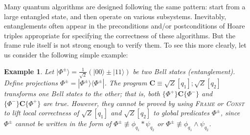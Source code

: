 \documentclass[conference,compsoc, 10pt]{IEEEtran}
\newcommand{\jh}[1]{\textit{\color{red}[JH] : #1}}
\newtheorem{example}{Example}[section]
\newcommand {\prog } {{\mathbf{C}}}
\def\>{\ensuremath{\rangle}}
\def\<{\ensuremath{\langle}}
\begin{document}
	Many quantum algorithms are designed following the same pattern: start from a
  large entangled state, and then operate on various subsystems. Inevitably,
  entanglements often appear in the preconditions and/or postconditions of Hoare
  triples appropriate for specifying the correctness of these algorithms.
  But the frame rule itself is not strong enough to verify them. To see this more clearly, let us consider the following simple example: 
  
 \begin{example}
 \label{exam verify entanglement}%
 Let $|\Phi^\pm\> = \frac{1}{\sqrt{2}}(|00\>\pm|11\>)$ be two %
 Bell states (entanglement). Define projections  $\Phi^\pm = |\Phi^\pm\>\<\Phi^\pm|$. The program $\prog\equiv {\sqrt{Z}}[q_1]; {\sqrt{Z}}[q_2]$ transforms one Bell states to the other; that is, both $\{\Phi^+\}\prog\{\Phi^-\}$ and $\{\Phi^-\}\prog\{\Phi^+\}$ are true. However, they cannot be proved by using \textsc{Frame} or \textsc{Const} to lift local correctness of ${\sqrt{Z}}[q_1]$ and ${\sqrt{Z}}[q_2]$ to global predicates $\Phi^\pm$, since $\Phi^\pm$ cannot be written in the form of $\Phi^\pm \not\equiv \phi_{q_1}\ast\psi_{q_2}$ or $\Phi^\pm \not\equiv \phi_{q_1}\wedge\psi_{q_2}$. \end{example}
	
\end{document}
